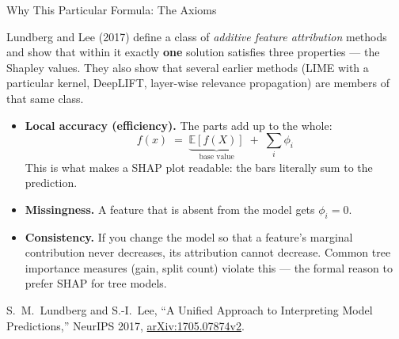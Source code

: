 \begin{frame}[allowframebreaks]{Why This Particular Formula: The Axioms}

    Lundberg and Lee (2017) define a class of \emph{additive feature attribution} methods and show
    that within it exactly \textbf{one} solution satisfies three properties --- the Shapley values.
    They also show that several earlier methods (LIME with a particular kernel, DeepLIFT,
    layer-wise relevance propagation) are members of that same class.

    \vspace{0.8em}

    \begin{itemize}
        \setlength\itemsep{0.5em}
        \item \textbf{Local accuracy (efficiency).} The parts add up to the whole:
              \[
                  f(x) \;=\; \underbrace{\mathbb{E}[f(X)]}_{\text{base value}} \;+\; \sum_{i} \phi_i
              \]
              This is what makes a SHAP plot readable: the bars literally sum to the prediction.
        \item \textbf{Missingness.} A feature that is absent from the model gets $\phi_i = 0$.
        \item \textbf{Consistency.} If you change the model so that a feature's marginal
              contribution never decreases, its attribution cannot decrease. Common tree importance
              measures (gain, split count) violate this --- the formal reason to prefer SHAP for
              tree models.
    \end{itemize}

    \vspace{0.3em}
    {\scriptsize S.~M.~Lundberg and S.-I.~Lee, ``A Unified Approach to Interpreting Model
    Predictions,'' NeurIPS 2017, \href{https://arxiv.org/abs/1705.07874v2}{arXiv:1705.07874v2}.}
\end{frame}

